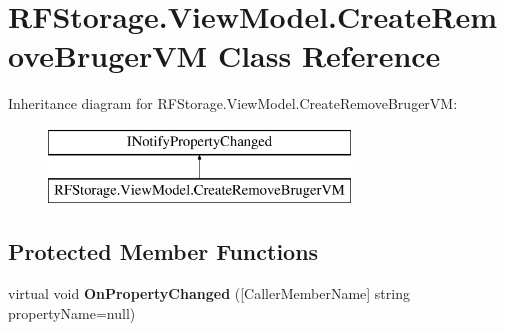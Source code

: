 \section{R\+F\+Storage.\+View\+Model.\+Create\+Remove\+Bruger\+VM Class Reference}
\label{class_r_f_storage_1_1_view_model_1_1_create_remove_bruger_v_m}
Inheritance diagram for R\+F\+Storage.\+View\+Model.\+Create\+Remove\+Bruger\+VM\+:\begin{figure}[H]
\begin{center}
\leavevmode
\includegraphics[height=2.000000cm]{class_r_f_storage_1_1_view_model_1_1_create_remove_bruger_v_m}
\end{center}
\end{figure}
\subsection*{Protected Member Functions}
\begin{DoxyCompactItemize}
\item 
\mbox{\label{class_r_f_storage_1_1_view_model_1_1_create_remove_bruger_v_m_aed26d4464dbae553e8eefe8bd874aef6}} 
virtual void {\bfseries On\+Property\+Changed} ([Caller\+Member\+Name] string property\+Name=null)
\end{DoxyCompactItemize}
